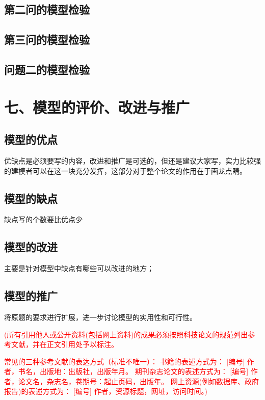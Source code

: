 \documentclass{my_paper}
\begin{document}
\subsection{第二问的模型检验}
\subsection{第三问的模型检验}
\subsection{问题二的模型检验}

\section{七、模型的评价、改进与推广}
\subsection{模型的优点}
优缺点是必须要写的内容，改进和推广是可选的，但还是建议大家写，实力比较强的建模者可以在这一块充分发挥，这部分对于整个论文的作用在于画龙点睛。
\subsection{模型的缺点}
缺点写的个数要比优点少
\subsection{模型的改进}
主要是针对模型中缺点有哪些可以改进的地方\cite{risken1996fokker}；
\subsection{模型的推广}
将原题的要求进行扩展\cite{rossler1979equation}，进一步讨论模型的实用性和可行性\cite{mckean1970nagumo}。

\begin{center}
\end{center}
\textcolor{red}{(所有引用他人或公开资料(包括网上资料)的成果必须按照科技论文的规范列出参考文献，并在正文引用处予以标注。}

\textcolor{red}{常见的三种参考文献的表达方式（标准不唯一）：
书籍的表述方式为： [编号] 作者，书名，出版地：出版社，出版年月。
期刊杂志论文的表述方式为： [编号] 作者，论文名，杂志名，卷期号：起止页码，出版年。
网上资源(例如数据库、政府报告)的表述方式为： [编号] 作者，资源标题，网址，访问时间。)}
\newpage
\end{document}

